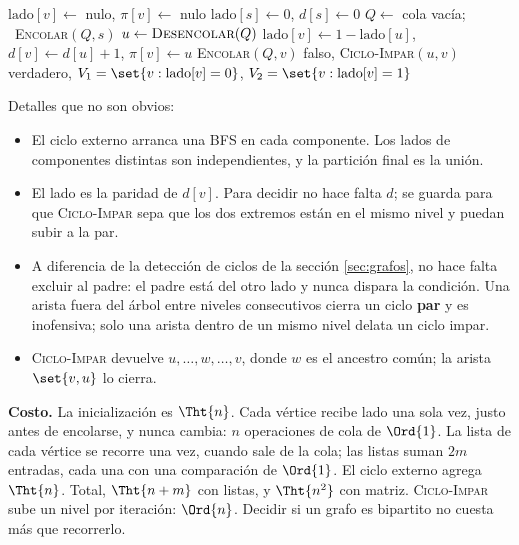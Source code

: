 \documentclass[11pt,letterpaper]{article}
\begin{document}
\begin{algorithm}[H]
\caption{\textsc{Bipartito}$(G)$: dos lados con BFS}
\label{alg:bipartito-bfs}
\begin{algorithmic}[1]
    \State $\text{lado}[v] \gets$ nulo, \quad $\pi[v] \gets$ nulo
  \EndFor
   
      \State $\text{lado}[s] \gets 0$, \quad $d[s] \gets 0$
      \State $Q \gets$ cola vacía; \ \textsc{Encolar}$(Q, s)$
        \State $u \gets \textsc{Desencolar}(Q)$
            \State $\text{lado}[v] \gets 1 - \text{lado}[u]$, \quad
                   $d[v] \gets d[u] + 1$, \quad $\pi[v] \gets u$
            \State \textsc{Encolar}$(Q, v)$
            \State \Return falso, \textsc{Ciclo-Impar}$(u, v)$
          \EndIf
        \EndFor
      \EndWhile
    \EndIf
  \EndFor
  \State \Return verdadero,
         $V_1 = \set{v : \text{lado}[v] = 0}$,
         $V_2 = \set{v : \text{lado}[v] = 1}$
\EndProcedure
\end{algorithmic}
\end{algorithm}

Detalles que no son obvios:
\begin{itemize}[itemsep=0.1em]
  \item El ciclo externo arranca una BFS en cada componente. Los lados
        de componentes distintas son independientes, y la partición
        final es la unión.
  \item El lado es la paridad de $d[v]$. Para decidir no hace falta
        $d$; se guarda para que \textsc{Ciclo-Impar} sepa que los dos
        extremos están en el mismo nivel y puedan subir a la par.
  \item A diferencia de la detección de ciclos de la sección
        \ref{sec:grafos}, no hace falta excluir al padre: el padre
        está del otro lado y nunca dispara la condición. Una arista
        fuera del árbol entre niveles consecutivos cierra un ciclo
        \textbf{par} y es inofensiva; solo una arista dentro de un
        mismo nivel delata un ciclo impar.
  \item \textsc{Ciclo-Impar} devuelve $u, \dots, w, \dots, v$, donde
        $w$ es el ancestro común; la arista $\set{v, u}$ lo cierra.
\end{itemize}

\textbf{Costo.} La inicialización es $\Tht{n}$. Cada vértice recibe
lado una sola vez, justo antes de encolarse, y nunca cambia: $n$
operaciones de cola de $\Ord{1}$. La lista de cada vértice se recorre
una vez, cuando sale de la cola; las listas suman $2m$ entradas, cada
una con una comparación de $\Ord{1}$. El ciclo externo agrega
$\Tht{n}$. Total, $\Tht{n + m}$ con listas, y $\Tht{n^2}$ con matriz.
\textsc{Ciclo-Impar} sube un nivel por iteración: $\Ord{n}$. Decidir
si un grafo es bipartito no cuesta más que recorrerlo.
\end{document}

